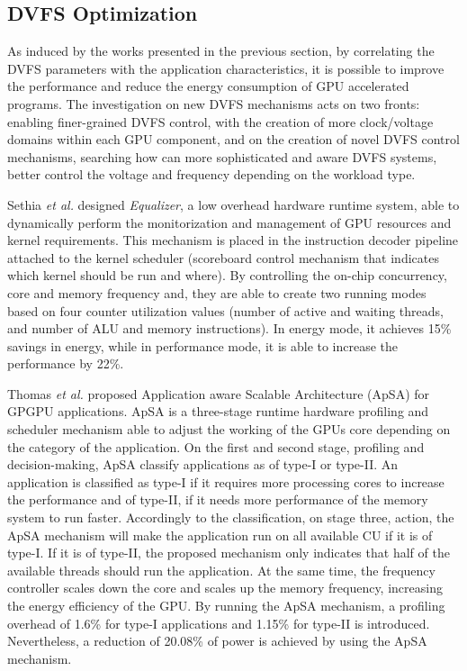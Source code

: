 \subsection{DVFS Optimization}

As induced by the works presented in the previous section, by correlating the DVFS parameters with the application characteristics, it is possible to improve the performance and reduce the energy consumption of GPU accelerated programs.  The investigation on new DVFS mechanisms acts on two fronts: enabling finer-grained DVFS control, with the creation of more clock/voltage domains within each GPU component, and on the creation of novel DVFS control mechanisms, searching how can more sophisticated and aware DVFS systems,  better control the voltage and frequency depending on the workload type.

Sethia \textit{et al.} \cite{sethia_equalizer:_2014} designed \textit{Equalizer}, a low overhead hardware runtime system, able to dynamically perform the monitorization and management of GPU resources and kernel requirements. This mechanism is placed in the instruction decoder pipeline attached to the kernel scheduler (scoreboard control mechanism that indicates which kernel should be run and where). By controlling the on-chip concurrency, core and memory frequency and, they are able to create two running modes based on four counter utilization values (number of active and waiting threads, and number of ALU and memory instructions). In energy mode, it achieves 15\% savings in energy, while in performance mode, it is able to increase the performance by 22\%.

Thomas \textit{et al.} \cite{thomas_application_2018} proposed Application aware Scalable Architecture (ApSA) for GPGPU applications. ApSA is a three-stage runtime hardware profiling and scheduler mechanism able to adjust the working of the GPUs core depending on the category of the application. On the first and second stage, profiling and decision-making, ApSA classify applications as of type-I or type-II. An application is classified as type-I if it requires more processing cores to increase the performance and of type-II, if it needs more performance of the memory system to run faster. Accordingly to the classification, on stage three, action, the ApSA mechanism will make the application run on all available CU if it is of type-I. If it is of type-II, the proposed mechanism only indicates that half of the available threads should run the application. At the same time, the frequency controller scales down the core and scales up the memory frequency, increasing the energy efficiency of the GPU. By running the ApSA mechanism, a profiling overhead of 1.6\% for type-I applications and 1.15\% for type-II is introduced. Nevertheless, a reduction of 20.08\% of power is achieved by using the ApSA mechanism.

